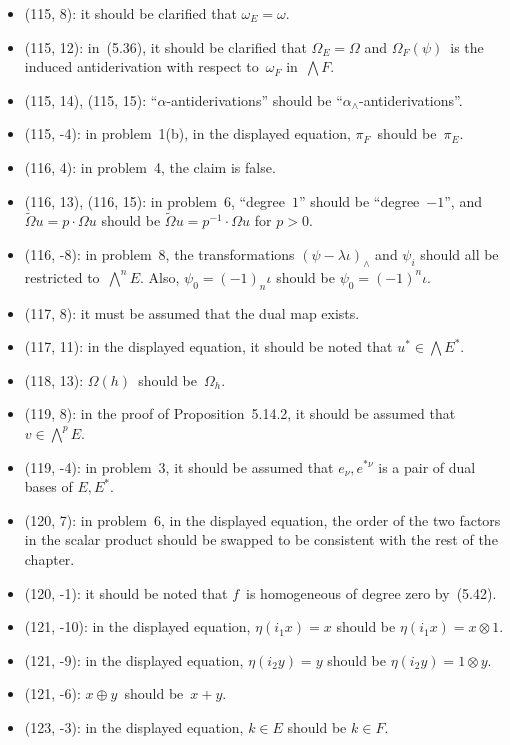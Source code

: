 \documentclass[letterpaper,12pt]{article}
\newcommand{\dsum}{\oplus}
\newcommand{\mult}{\cdot}
\newcommand{\tprod}{\otimes}
\newcommand{\eprod}{\wedge}
\newcommand{\bigeprod}{\bigwedge}
\begin{document}
\begin{itemize}
\item (115, 8): it should be clarified that \(\omega_E=\omega\).
\item (115, 12): in~(5.36), it should be clarified that \(\Omega_E=\Omega\) and \(\Omega_F(\psi)\)~is the induced antiderivation with respect to~\(\omega_F\) in~\(\bigeprod F\).
\item (115, 14), (115, 15): ``\(\alpha\)-antiderivations'' should be ``\(\alpha_{\eprod}\)-antiderivations''.
\item (115, -4): in problem~1(b), in the displayed equation, \(\pi_F\)~should be~\(\pi_E\).
\item (116, 4): in problem~4, the claim is false.
\item (116, 13), (116, 15): in problem~6, ``degree~\(1\)'' should be ``degree~\(-1\)'', and \(\widetilde{\Omega}u=p\mult\Omega u\) should be \(\widetilde{\Omega}u=p^{-1}\mult\Omega u\) for \(p>0\).
\item (116, -8): in problem~8, the transformations \((\psi-\lambda\iota)_{\eprod}\) and \(\psi_i\) should all be restricted to~\(\bigeprod^n E\). Also, \(\psi_0=(-1)_n\iota\) should be \(\psi_0=(-1)^n\iota\).
\item (117, 8): it must be assumed that the dual map exists.
\item (117, 11): in the displayed equation, it should be noted that \(u^*\in\bigeprod E^*\).
\item (118, 13): \(\Omega(h)\)~should be~\(\Omega_h\).
\item (119, 8): in the proof of Proposition~5.14.2, it should be assumed that \(v\in\bigeprod^p E\).
\item (119, -4): in problem~3, it should be assumed that \(e_{\nu},e^{*\nu}\) is a pair of dual bases of \(E,E^*\).
\item (120, 7): in problem~6, in the displayed equation, the order of the two factors in the scalar product should be swapped to be consistent with the rest of the chapter.
\item (120, -1): it should be noted that \(f\)~is homogeneous of degree zero by~(5.42).
\item (121, -10): in the displayed equation, \(\eta(i_1x)=x\) should be \(\eta(i_1x)=x\tprod 1\).
\item (121, -9): in the displayed equation, \(\eta(i_2y)=y\) should be \(\eta(i_2y)=1\tprod y\).
\item (121, -6): \(x\dsum y\)~should be~\(x+y\).
\item (123, -3): in the displayed equation, \(k\in E\) should be \(k\in F\).

\end{itemize}
\end{document}
